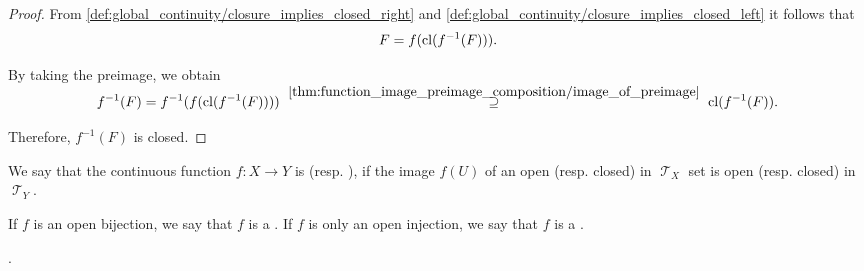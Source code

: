 \begin{proof}
  From \eqref{def:global_continuity/closure_implies_closed_right} and \eqref{def:global_continuity/closure_implies_closed_left} it follows that
  \begin{equation*}
    F = f(\operatorname{cl}(f^{-1}(F))).
  \end{equation*}

  By taking the preimage, we obtain
  \begin{equation*}
    f^{-1}(F)
    =
    f^{-1}(f(\cl(f^{-1}(F))))
    \reloset {\ref{thm:function_image_preimage_composition/image_of_preimage}} \supseteq
    \cl(f^{-1}(F)).
  \end{equation*}

  Therefore, \( f^{-1}(F) \) is closed.
\end{proof}

\begin{definition}\label{def:homeomorphism}
  We say that the continuous function \( f: X \to Y \) is  (resp. ), if the image \( f(U) \) of an open (resp. closed) in \( \mscrT_X \) set is open (resp. closed) in \( \mscrT_Y \).

  If \( f \) is an open bijection, we say that \( f \) is a . If \( f \) is only an open injection, we say that \( f \) is a .
\end{definition}

\begin{definition}\label{def:fundamental_groupoid}
  .
\end{definition}

